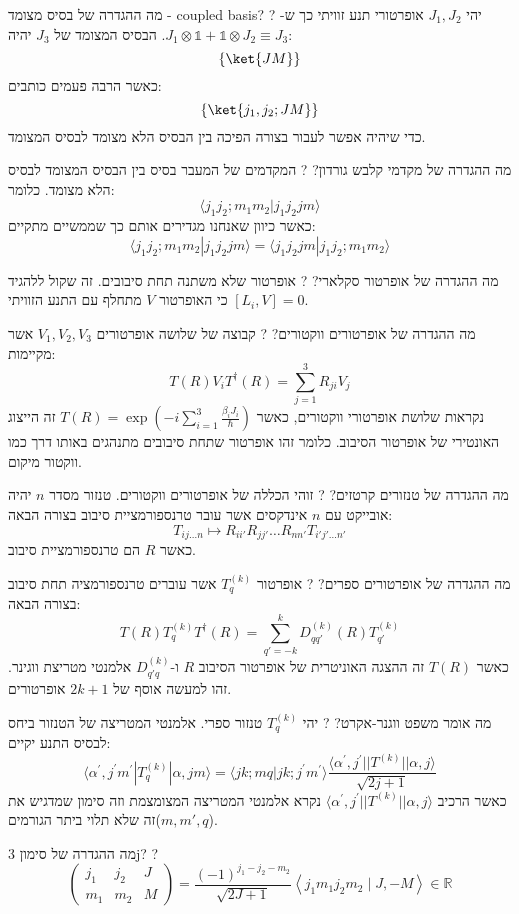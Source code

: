 \documentclass{tstextbook}
\begin{document}
מה ההגדרה של בסיס מצומד - coupled basis?
?
יהי \(J_{1},J_{2}\) אופרטורי תנע זוויתי כך ש-\(J_{1}\otimes \mathbb{1} +\mathbb{1} \otimes J_{2}\equiv J_{3}\). הבסיס המצומד של \(J_{3}\) יהיה:
$$\left\{  \ket{JM}   \right\}$$
כאשר הרבה פעמים כותבים:
$$\left\{  \ket{j_{1},j_{2};JM}   \right\}$$
כדי שיהיה אפשר לעבור בצורה הפיכה בין הבסיס הלא מצומד לבסיס המצומד.

מה ההגדרה של מקדמי קלבש גורדון?
?
המקדמים של המעבר בסיס בין הבסיס המצומד לבסיס הלא מצומד. כלומר:
$$\langle j_{1}j_{2};m_{1}m_{2}|j_{1}j_{2}j m\rangle$$
כאשר כיוון שאנחנו מגדירים אותם כך שממשיים מתקיים:
$$\langle j_{1}j_{2};m_{1}m_{2}|j_{1}j_{2}j m\rangle=\langle j_{1}j_{2}j m|j_{1}j_{2};m_{1}m_{2}\rangle$$

מה ההגדרה של אופרטור סקלארי?
?
אופרטור שלא משתנה תחת סיבובים. זה שקול ללהגיד כי האופרטור \(V\)  מתחלף עם התנע הזוויתי \([L_{i},V]=0\).

מה ההגדרה של אופרטורים ווקטורים?
?
קבוצה של שלושה אופרטורים \(V_{1},V_{2},V_{3}\) אשר מקיימות:
$$T(R)V_{i}T^{\dagger}(R)=\sum_{j=1}^{3}R_{j i}V_{j}$$
נקראות שלושת אופרטורי ווקטורים, כאשר \(T(R)=\exp\left( -i\sum_{i=1}^{3}\frac{\beta_{i}J_{i}}{\hbar} \right)\) זה הייצוג האונטירי של אופרטור הסיבוב. כלומר זהו אופרטור שתחת סיבובים מתנהגים באותו דרך כמו ווקטור מיקום.

מה ההגדרה של טנזורים קרטזים?
?
זוהי הכללה של אופרטורים ווקטורים. טנזור מסדר \(n\) יהיה אובייקט עם \(n\) אינדקסים אשר עובר טרנספורמציית סיבוב בצורה הבאה:
$$T_{ij \dots n}\mapsto R_{ii'}R_{jj'} \dots R_{nn'} T_{i' j' \dots n'}$$
כאשר \(R\) הם טרנספורמציית סיבוב.

מה ההגדרה של אופרטורים ספרים?
?
אופרטור \(T_{q}^{(k)}\) אשר עוברים טרנספורמציה תחת סיבוב בצורה הבאה:
$$T(R)T_{q}^{(k)}T^{\dagger}(R) =\sum_{q'=-k}^{k}D^{(k)}_{qq'}(R)T_{q'}^{(k)}$$
כאשר \(T(R)\) זה ההצגה האוניטרית של אופרטור הסיבוב \(R\) ו-\(D_{q'q}^{(k)}\) אלמנטי מטריצת ווגינר. זהו למעשה אוסף של \(2k+1\) אופרטורים.

מה אומר משפט ווגנר-אקרט?
?
יהי \(T_{q}^{(k)}\) טנזור ספרי. אלמנטי המטריצה של הטנזור ביחס לבסיס התנע יקיים:
$$\langle\alpha^{\prime},j^{\prime}m^{\prime}|T_{q}^{(k)}|\alpha,j m\rangle=\langle j k;m q|j k;j^{\prime}m^{\prime}\rangle\frac{\langle\alpha^{\prime},j^{\prime}||T^{(k)}||\alpha,j\rangle}{\sqrt{2j+1}}$$
כאשר הרכיב \(\langle\alpha^{\prime},j^{\prime}||T^{(k)}||\alpha,j\rangle\) נקרא אלמנטי המטריצה המצומצמת וזה סימון שמדגיש את זה שלא תלוי ביתר הגורמים(\(m,m',q\)).

מה ההגדרה של סימון 3j?
?
$$\begin{pmatrix}j_{1} & j_{2} & J \\m_{1} & m_{2} & M 
\end{pmatrix}= \frac{(-1)^{j_{1}-j_{2}-m_{2}}}{\sqrt{ 2J+1 }}\left\langle  j_{1}m_{1}j_{2}m_{2}\mid J,-M  \right\rangle \in \mathbb{R}$$
\end{document}
